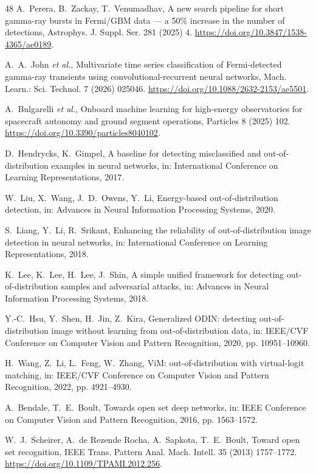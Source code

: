 \documentclass{ieeeaccess}
\begin{document}
\begin{thebibliography}{48}
 A.~Perera, B.~Zackay, T.~Venumadhav, A new search pipeline for short gamma-ray bursts in Fermi/GBM data --- a 50\% increase in the number of detections, Astrophys. J. Suppl. Ser. 281 (2025) 4. \url{https://doi.org/10.3847/1538-4365/ae0189}.

 A.~A.~John \textit{et al.}, Multivariate time series classification of Fermi-detected gamma-ray transients using convolutional-recurrent neural networks, Mach. Learn.: Sci. Technol. 7 (2026) 025046. \url{https://doi.org/10.1088/2632-2153/ae5501}.

 A.~Bulgarelli \textit{et al.}, Onboard machine learning for high-energy observatories for spacecraft autonomy and ground segment operations, Particles 8 (2025) 102. \url{https://doi.org/10.3390/particles8040102}.

 D.~Hendrycks, K.~Gimpel, A baseline for detecting misclassified and out-of-distribution examples in neural networks, in: International Conference on Learning Representations, 2017.

 W.~Liu, X.~Wang, J.~D.~Owens, Y.~Li, Energy-based out-of-distribution detection, in: Advances in Neural Information Processing Systems, 2020.

 S.~Liang, Y.~Li, R.~Srikant, Enhancing the reliability of out-of-distribution image detection in neural networks, in: International Conference on Learning Representations, 2018.

 K.~Lee, K.~Lee, H.~Lee, J.~Shin, A simple unified framework for detecting out-of-distribution samples and adversarial attacks, in: Advances in Neural Information Processing Systems, 2018.

 Y.-C.~Hsu, Y.~Shen, H.~Jin, Z.~Kira, Generalized ODIN: detecting out-of-distribution image without learning from out-of-distribution data, in: IEEE/CVF Conference on Computer Vision and Pattern Recognition, 2020, pp. 10951--10960.

 H.~Wang, Z.~Li, L.~Feng, W.~Zhang, ViM: out-of-distribution with virtual-logit matching, in: IEEE/CVF Conference on Computer Vision and Pattern Recognition, 2022, pp. 4921--4930.

 A.~Bendale, T.~E.~Boult, Towards open set deep networks, in: IEEE Conference on Computer Vision and Pattern Recognition, 2016, pp. 1563--1572.

 W.~J.~Scheirer, A.~de Rezende Rocha, A.~Sapkota, T.~E.~Boult, Toward open set recognition, IEEE Trans. Pattern Anal. Mach. Intell. 35 (2013) 1757--1772. \url{https://doi.org/10.1109/TPAMI.2012.256}.


\end{thebibliography}
\end{document}
